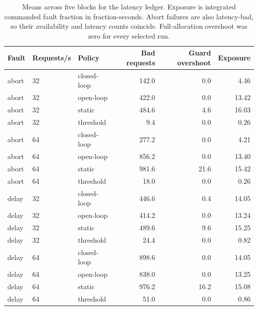 \begin{table}[width=\textwidth,cols=6,pos=t]
\caption{Means across five blocks for the latency ledger. Exposure is integrated commanded fault fraction in fraction-seconds. Abort failures are also latency-bad, so their availability and latency counts coincide. Full-allocation overshoot was zero for every selected run.}\label{tbl:means}
\small
\begin{tabular*}{\tblwidth}{@{\extracolsep{\fill}}lllr rr@{}}
\toprule
Fault & Requests/s & Policy & Bad requests & Guard overshoot & Exposure \\
\midrule
abort & 32 & closed-loop & 142.0 & 0.0 & 4.46 \\
abort & 32 & open-loop & 422.0 & 0.0 & 13.42 \\
abort & 32 & static & 484.6 & 4.6 & 16.03 \\
abort & 32 & threshold & 9.4 & 0.0 & 0.26 \\
abort & 64 & closed-loop & 277.2 & 0.0 & 4.21 \\
abort & 64 & open-loop & 856.2 & 0.0 & 13.40 \\
abort & 64 & static & 981.6 & 21.6 & 15.42 \\
abort & 64 & threshold & 18.0 & 0.0 & 0.26 \\
delay & 32 & closed-loop & 446.6 & 0.4 & 14.05 \\
delay & 32 & open-loop & 414.2 & 0.0 & 13.24 \\
delay & 32 & static & 489.6 & 9.6 & 15.25 \\
delay & 32 & threshold & 24.4 & 0.0 & 0.82 \\
delay & 64 & closed-loop & 898.6 & 0.0 & 14.05 \\
delay & 64 & open-loop & 838.0 & 0.0 & 13.25 \\
delay & 64 & static & 976.2 & 16.2 & 15.08 \\
delay & 64 & threshold & 51.0 & 0.0 & 0.86 \\
\bottomrule
\end{tabular*}
\end{table}
